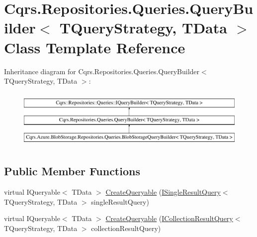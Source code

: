 \hypertarget{classCqrs_1_1Repositories_1_1Queries_1_1QueryBuilder}{}\section{Cqrs.\+Repositories.\+Queries.\+Query\+Builder$<$ T\+Query\+Strategy, T\+Data $>$ Class Template Reference}
\label{classCqrs_1_1Repositories_1_1Queries_1_1QueryBuilder}
Inheritance diagram for Cqrs.\+Repositories.\+Queries.\+Query\+Builder$<$ T\+Query\+Strategy, T\+Data $>$\+:\begin{figure}[H]
\begin{center}
\leavevmode
\includegraphics[height=2.876712cm]{classCqrs_1_1Repositories_1_1Queries_1_1QueryBuilder}
\end{center}
\end{figure}
\subsection*{Public Member Functions}
\begin{DoxyCompactItemize}
\item 
virtual I\+Queryable$<$ T\+Data $>$ \hyperlink{classCqrs_1_1Repositories_1_1Queries_1_1QueryBuilder_a6b103726f538e81ca0489a51b1aa3c88}{Create\+Queryable} (\hyperlink{interfaceCqrs_1_1Repositories_1_1Queries_1_1ISingleResultQuery}{I\+Single\+Result\+Query}$<$ T\+Query\+Strategy, T\+Data $>$ single\+Result\+Query)
\item 
virtual I\+Queryable$<$ T\+Data $>$ \hyperlink{classCqrs_1_1Repositories_1_1Queries_1_1QueryBuilder_af8860edf3677cb80ae481f17ff2db9b5}{Create\+Queryable} (\hyperlink{interfaceCqrs_1_1Repositories_1_1Queries_1_1ICollectionResultQuery}{I\+Collection\+Result\+Query}$<$ T\+Query\+Strategy, T\+Data $>$ collection\+Result\+Query)
\end{DoxyCompactItemize}
